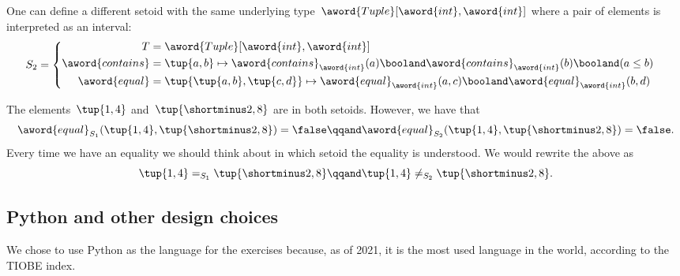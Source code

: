 One can define a different setoid with the same underlying type~$\aword{Tuple}[\aword{int}, \aword{int}]$ where a pair of elements is interpreted as an interval:
\begin{equation}
    S_2 =
    \begin{cases}
        \begin{aligned}
            T                & = \aword{Tuple}[\aword{int}, \aword{int}] \\
            \aword{contains} & = \tup{a,b} \mapsto
            \aword{contains}_{\aword{int}}(a)
            \booland
            \aword{contains}_{\aword{int}}(b)
            \booland
            (a\leq b) \\
            \aword{equal}    & = \tup{\tup{a,b}, \tup{c,d}}
            \mapsto
            \aword{equal}_{\aword{int}}(a,c)
            \booland
            \aword{equal}_{\aword{int}}(b,d)
        \end{aligned}
    \end{cases}
\end{equation}

The elements~$\tup{1,4}$ and~$\tup{\shortminus 2, 8}$ are in both setoids.
However, we have that
\begin{equation}
    \aword{equal}_{S_1} (\tup{1,4}, \tup{\shortminus 2, 8}) = \false
    \qqand
    \aword{equal}_{S_2} (\tup{1,4}, \tup{\shortminus 2, 8}) = \false .
\end{equation}
Every time we have an equality we should think about in which setoid the equality is understood.
We would rewrite the above as
\begin{equation}
    \tup{1,4} =_{S_1} \tup{ \shortminus 2, 8}
    \qqand
    \tup{1,4} \neq_{S_2} \tup{\shortminus 2, 8}.
\end{equation}

\subsection{Python and other design choices}

We chose to use Python as the language for the exercises because, as of 2021, it is the most used language in the world, according to the TIOBE index.

